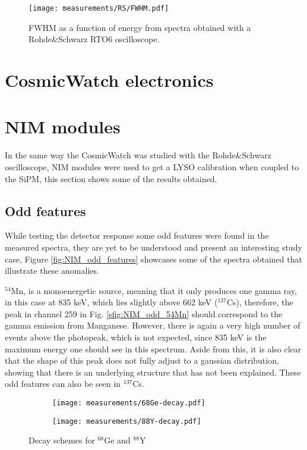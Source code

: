 \begin{figure}[H]
  \centering
  \texttt{[image: measurements/RS/FWHM.pdf]}
  \caption{\label{fig:RS_FWHM}FWHM as a function of energy from spectra obtained with a Rohde\&Schwarz RTO6 oscilloscope.}
\end{figure}

\section{CosmicWatch electronics}

\section{NIM modules}

In the same way the CosmicWatch was studied with the Rohde\&Schwarz oscilloscope, NIM modules were used to get a LYSO calibration when coupled to the SiPM, this section shows some of the results obtained.

\subsection{Odd features}

While testing the detector response some odd features were found in the measured spectra, they are yet to be understood and present an interesting study case, Figure \ref{fig:NIM_odd_features} showcases some of the spectra obtained that illustrate these anomalies. 

$^{54}$Mn, is a monoenergetic source, meaning that it only produces one gamma ray, in this case at 835 \unit{\kilo\eV}, which lies slightly above 662 \unit{\kilo\eV} ($^{137}$Cs), therefore, the peak in channel 259 in Fig. \ref{sfig:NIM_odd_54Mn} should correspond to the gamma emission from Manganese. However, there is again a very high number of events above the photopeak, which is not expected, since 835 \unit{\kilo\eV} is the maximum energy one should see in this spectrum. Aside from this, it is also clear that the shape of this peak does not fully adjust to a gaussian distribution, showing that there is an underlying structure that has not been explained. These odd features can also be seen in $^{137}$Cs.

\begin{figure}[H]
  \centering
  \begin{subfigure}[t]{0.53\textwidth}
    \texttt{[image: measurements/68Ge-decay.pdf]}
    \caption{\label{sfig:68Ge_decay_scheme}}
  \end{subfigure}
  \begin{subfigure}[t]{0.425\textwidth}
    \texttt{[image: measurements/88Y-decay.pdf]}
    \caption{\label{sfig:88Y_decay_scheme}}
  \end{subfigure}
  \caption{\label{fig:some_decay_schemes}Decay schemes for $^{68}$Ge and $^{88}$Y}
\end{figure}

